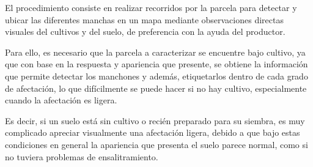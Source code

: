 El procedimiento consiste en realizar recorridos por la parcela para detectar y ubicar las diferentes manchas en un mapa mediante observaciones directas visuales del cultivos y del suelo, de preferencia con la ayuda del productor.

Para ello, es necesario que la parcela a caracterizar se encuentre bajo cultivo, ya que con base en la respuesta y apariencia que presente, se obtiene la información que permite detectar los manchones y además, etiquetarlos dentro de cada grado de afectación, lo que difícilmente se puede hacer si no hay cultivo, especialmente cuando la afectación es ligera.

Es decir, si un suelo está sin cultivo o recién preparado para su siembra, es muy complicado apreciar visualmente una afectación ligera, debido a que bajo estas condiciones en general la apariencia que presenta el suelo parece normal, como si no tuviera problemas de ensalitramiento.

